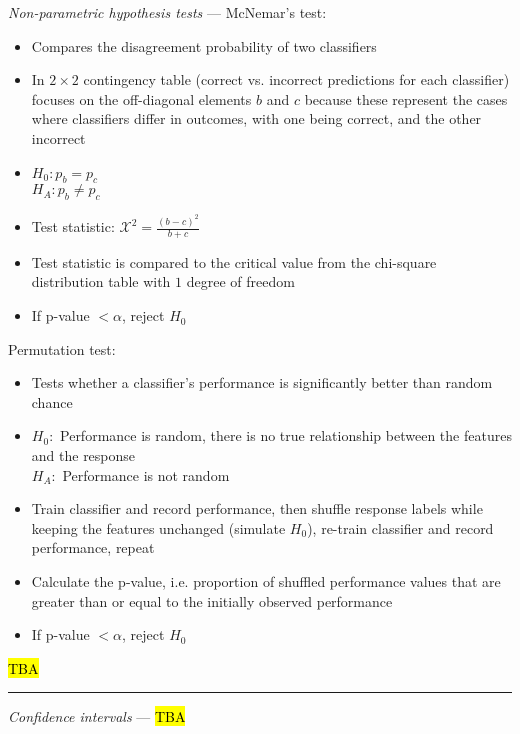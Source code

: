 \emph{Non-parametric hypothesis tests} --- 
McNemar’s test:
\begin{itemize}
    \item Compares the disagreement probability of two classifiers 
    \item In $2 \times 2$ contingency table (correct vs. incorrect predictions for each classifier) focuses on the off-diagonal elements $b$ and $c$ because these represent the cases where classifiers differ in outcomes, with one being correct, and the other incorrect
    \item $H_0: p_b = p_c$\\
    $H_A: p_b \neq p_c$
    \item Test statistic: $\mathcal{X}^2 = \frac{(b-c)^2}{b+c}$
    \item Test statistic is compared to the critical value from the chi-square distribution table with $1$ degree of freedom
    \item If p-value $< \alpha$, reject $H_0$
\end{itemize}
Permutation test:
\begin{itemize}
    \item Tests whether a classifier's performance is significantly better than random chance
    \item $H_0:$ Performance is random, there is no true relationship between the features and the response\\
    $H_A:$ Performance is not random
    \item Train classifier and record performance, then shuffle response labels while keeping the features unchanged (simulate $H_0$), re-train classifier and record performance, repeat
    \item Calculate the p-value, i.e. proportion of shuffled performance values that are greater than or equal to the initially observed performance
    \item If p-value $< \alpha$, reject $H_0$
\end{itemize}
\hl{TBA}

{\color{lightgray}\hrule height 0.001mm}

\emph{Confidence intervals} --- \hl{TBA}